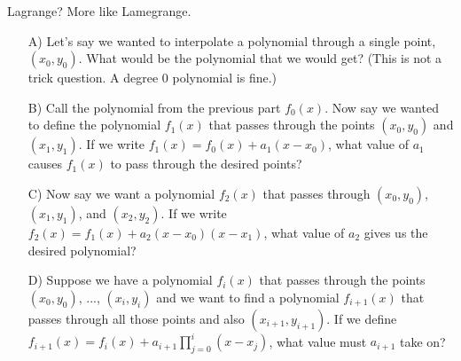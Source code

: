 \begin{homeworkProblem}{Lagrange? More like Lamegrange.}

    \begin{itemize}

        \item[A)] Let's say we wanted to interpolate a polynomial through a 
        single point, $(x_0, y_0)$. What would be the polynomial that we would 
        get? (This is not a trick question. A degree 0 polynomial is fine.)
        
        \item[B)] Call the polynomial from the previous part $f_0(x)$. Now say 
        we wanted to define the polynomial $f_1(x)$ that passes through the 
        points $(x_0, y_0)$ and $(x_1, y_1)$. If we write $f_1(x) = f_0(x) + 
        a_1(x - x_0)$, what value of $a_1$ causes $f_1(x)$ to pass through the 
        desired points?
        
        \item[C)] Now say we want a polynomial $f_2(x)$ that passes through 
        $(x_0, y_0)$, $(x_1, y_1)$, and $(x_2, y_2)$. If we write $f_2(x) = 
        f_1(x) + a_2(x - x_0)(x - x_1)$, what value of $a_2$ gives us the 
        desired polynomial?
        
        \item[D)] Suppose we have a polynomial $f_i(x)$ that passes through the 
        points $(x_0, y_0)$, ..., $(x_i, y_i)$ and we want to find a polynomial 
        $f_{i + 1}(x)$ that passes through all those points and also $(x_{i + 
        1}, y_{i + 1})$. If we define $f_{i + 1}(x) = f_i(x) + a_{i + 1}\prod_{j 
        = 0}^i (x - x_j)$, what value must $a_{i + 1}$ take on?

    \end{itemize}

\end{homeworkProblem}
